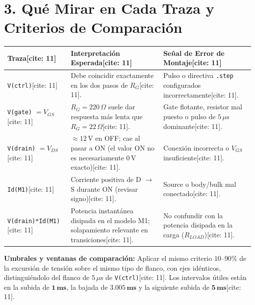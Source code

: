 \documentclass[11pt, a4paper]{article}
\begin{document}
\section*{3. Qué Mirar en Cada Traza y Criterios de Comparación}
\renewcommand{\arraystretch}{1.25}
\noindent
\begin{tabularx}{\textwidth}{@{} l >{\raggedright\arraybackslash}X >{\raggedright\arraybackslash}X @{}}
\toprule
\textbf{Traza}[cite: 11] & \textbf{Interpretación Esperada}[cite: 11] & \textbf{Señal de Error de Montaje}[cite: 11] \\ \midrule
\texttt{V(ctrl)}[cite: 11] & Debe coincidir exactamente en los dos pasos de $R_G$[cite: 11]. & Pulso o directiva \texttt{.step} configurados incorrectamente[cite: 11]. \\
\texttt{V(gate)} $= V_{GS}$[cite: 11] & $R_G = 220\,\Omega$ suele dar respuesta más lenta que $R_G = 22\,\Omega$[cite: 11]. & Gate flotante, resistor mal puesto o pulso de $5\,\mu\text{s}$ dominante[cite: 11]. \\
\texttt{V(drain)} $= V_{DS}$[cite: 11] & $\approx 12\,\text{V}$ en OFF; cae al pasar a ON (el valor ON no es necesariamente $0\,\text{V}$ exacto)[cite: 11]. & Conexión incorrecta o $V_{GS}$ insuficiente[cite: 11]. \\
\texttt{Id(M1)}[cite: 11] & Corriente positiva de D $\to$ S durante ON (revisar signo)[cite: 11]. & Source o body/bulk mal conectado[cite: 11]. \\
\texttt{V(drain)*Id(M1)}[cite: 11] & Potencia instantánea disipada en el modelo M1; solapamiento relevante en transiciones[cite: 11]. & No confundir con la potencia disipada en la carga ($R_{LOAD}$)[cite: 11]. \\ \bottomrule
\end{tabularx}

\vspace{0.2cm}
\noindent\textbf{Umbrales y ventanas de comparación:} Aplicar el mismo criterio $10\text{--}90\%$ de la excursión de tensión sobre el mismo tipo de flanco, con ejes idénticos, distinguiéndolo del flanco de $5\,\mu\text{s}$ de \texttt{V(ctrl)}[cite: 11]. Los intervalos útiles están en la subida de $\mathbf{1\,\text{ms}}$, la bajada de $\mathbf{3.005\,\text{ms}}$ y la siguiente subida de $\mathbf{5\,\text{ms}}$[cite: 11].

\newpage
\end{document}
